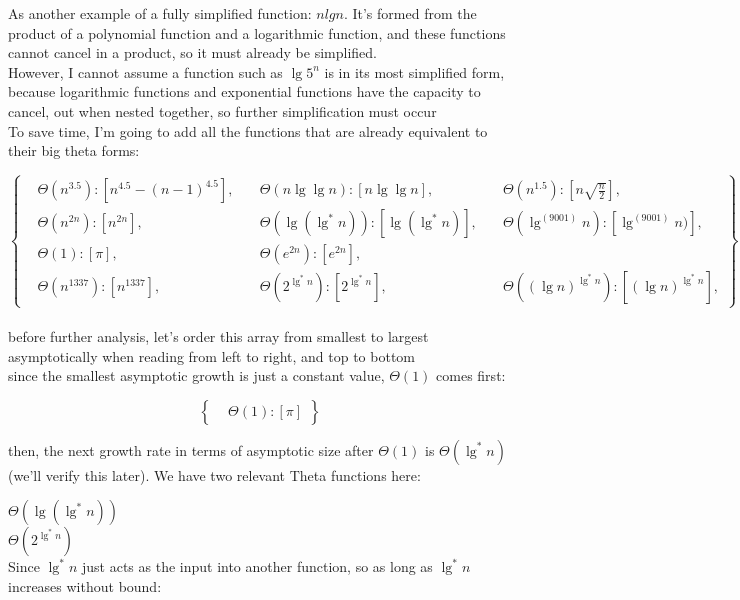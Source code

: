 \documentclass[11pt,fleqn]{article}
\theoremstyle{definition}
\theoremstyle{remark}
\begin{document}
As another example of a fully simplified function: $nlgn$. It's formed
from the product of a polynomial function and a logarithmic function, and
these functions cannot cancel in a product, so it must already be simplified.\\

However, I cannot assume a function such as $\lg 5^n$ is in its most 
simplified form, because logarithmic functions and exponential functions
have the capacity to cancel, out when nested together, so further 
simplification must occur\\

To save time, I'm going to add all the functions that are already 
equivalent to their big theta forms:

\[
\left\{
\begin{aligned}
& \Theta(n^{3.5}): [n^{4.5} - (n - 1)^{4.5}], 
& \quad \Theta(n \lg \lg n): [n \lg \lg n],
& \quad \Theta(n^{1.5}): [n\sqrt{\frac{n}{2}}],\\
& \Theta(n^{2n}): [n^{2n}],
& \quad \Theta(\lg(\lg^*n)): [\lg(\lg^*n)],
& \quad \Theta(\lg^{(9001)} n): [\lg^{(9001)} n)],\\
& \Theta(1): [\pi],
& \quad \Theta(e^{2n}): [e^{2n}],\\
& \Theta(n^{1337}): [n^{1337}],
& \quad \Theta(2^{\lg^*{n}}): [2^{\lg^*{n}}],
& \quad \Theta({(\lg n)}^{\lg^*{n}}): [{(\lg n)}^{\lg^*{n}}],
\end{aligned}
\right\}
\]\\

before further analysis, let's order this array from smallest
to largest asymptotically when reading from left to right, and top 
to bottom\\

since the smallest asymptotic growth is just a constant value,
$\Theta(1)$ comes first:

\[
\left\{
\begin{aligned}
& \Theta(1): [\pi]
\end{aligned}
\right\}
\]

then, the next growth rate in terms of asymptotic size after $\Theta(1)$
is $\Theta(\lg^*n)$ (we'll verify this later). We have two relevant Theta functions here: 

$\Theta(\lg(\lg^*n))$\\
$\Theta(2^{\lg^*n})$\\

Since $\lg^*n$ just acts as the input into another function, 
so as long as $\lg^*n$ increases without bound:\\
\end{document}
